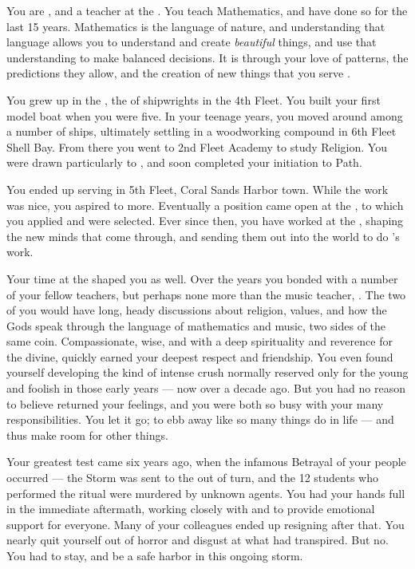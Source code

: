 \documentclass[char]{GL2020}
\begin{document}
\name{\cFlowPriest{}}

You are \cFlowPriest{\intro}, and a teacher at the \pSchool{}. You teach Mathematics, and have done so for the last 15 years. Mathematics is the language of nature, and understanding that language allows you to understand and create \emph{beautiful} things, and use that understanding to make balanced decisions. It is through your love of patterns, the predictions they allow, and the creation of new things that you serve \cFlow{\full}.

You grew up in the \pShip{}, the \cFlowPriest{\offspring} of shipwrights in the 4th Fleet. You built your first model boat when you were five. In your teenage years, you moved around among a number of ships, ultimately settling in a woodworking compound in 6th Fleet Shell Bay. From there you went to 2nd Fleet Academy to study Religion. You were drawn particularly to \cFlow{}, and soon completed your initiation to \cFlow{\their} Path.

You ended up serving in 5th Fleet, Coral Sands Harbor town. While the work was nice, you aspired to more. Eventually a position came open at the \pSchool{}, to which you applied and were selected. Ever since then, you have worked at the \pSc{}, shaping the new minds that come through, and sending them out into the world to do \cFlow{}'s work.

Your time at the \pSchool{} shaped you as well. Over the years you bonded with a number of your fellow teachers, but perhaps none more than the music teacher, \cMusic{\full}. The two of you would have long, heady discussions about religion, values, and how the Gods speak through the language of mathematics and music, two sides of the same coin. Compassionate, wise, and with a deep spirituality and reverence for the divine, \cMusic{} quickly earned your deepest respect and friendship. You even found yourself developing the kind of intense crush normally reserved only for the young and foolish in those early years — now over a decade ago. But you had no reason to believe \cMusic{} returned your feelings, and you were both so busy with your many responsibilities. You let it go; to ebb away like so many things do in life — and thus make room for other things.

Your greatest test came six years ago, when the infamous Betrayal of your people occurred — the Storm was sent to the \pShip{} out of turn, and the 12 students who performed the ritual were murdered by unknown agents. You had your hands full in the immediate aftermath, working closely with \cEthics{\full} and \cMusic{} to provide emotional support for everyone. Many of your colleagues ended up resigning after that. You nearly quit yourself out of horror and disgust at what had transpired. But no. You had to stay, and be a safe harbor in this ongoing storm. 
\end{document}

